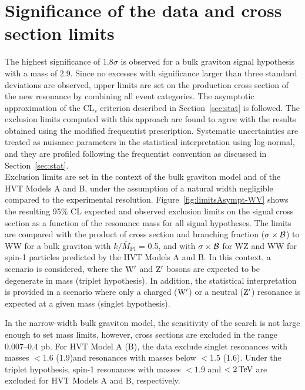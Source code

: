 \section{Significance of the data and cross section limits}

The highest significance of 1.8$\sigma$ is observed for a bulk graviton signal hypothesis with a mass of 2.9\TeV.
Since no excesses with significance larger than three standard deviations are observed, upper limits are set on the production cross section of the new resonance by combining all event categories.
The asymptotic approximation of the $\mathrm{CL}_s$ criterion described in Section~\ref{sec:stat} is followed.
The exclusion limits computed with this approach are found to agree with the results obtained using the modified frequentist prescription.
Systematic uncertainties are treated as nuisance parameters in the statistical interpretation using log-normal, and they are profiled following the frequentist convention as discussed in Section~\ref{sec:stat}.\\

Exclusion limits are set in the context of the bulk graviton model and of the HVT Models A and B, under the assumption of a natural width negligible compared to the experimental resolution.
Figure~\ref{fig:limitsAsympt-WV} shows the resulting 95\% CL expected and observed exclusion limits on the signal cross section as a function of the resonance mass for all signal hypotheses.
The limits are compared with the product of cross section and branching fraction ($\sigma\times\cal{B}$) to WW for a bulk graviton with $k/\bar{M}_\mathrm{Pl}$ = 0.5,
and with $\sigma\times\cal{B}$ for WZ and WW for spin-1 particles predicted by the HVT Models A and B.
In this context, a scenario is considered, where the $\mathrm{W}^\prime$ and $\mathrm{Z}^\prime$ bosons are expected to be degenerate in mass (triplet hypothesis).
In addition, the statistical interpretation is provided in a scenario where only a charged ($\mathrm{W}^\prime$) or a neutral ($\mathrm{Z}^\prime$) resonance is expected at a given mass (singlet hypothesis).

In the narrow-width bulk graviton model, the sensitivity of the search is not large enough to set mass limits, however, cross sections are excluded in the range 0.007--0.4 pb.
For HVT Model A (B), the data exclude singlet \Wpr resonances with masses $< 1.6$ (1.9)\TeV and \Zpr resonances with masses below $< 1.5$ (1.6)\TeV.
Under the triplet hypothesis, spin-1 resonances with masses $< 1.9$ and $< 2\,\text{Te\hspace{-.08em}V}$ are excluded for HVT Models A and B, respectively.

